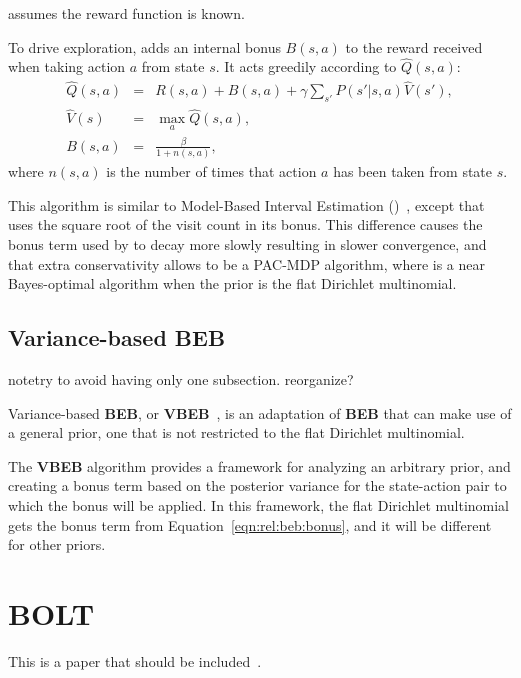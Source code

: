  assumes the reward function is known.

To drive exploration,  adds an internal bonus $B(s,a)$ to the reward received when taking action $a$ from state $s$. It acts greedily according to $\hat Q(s,a)$:
\begin{eqnarray}
\hat Q(s,a)&=&R(s,a)+B(s,a)+\gamma \sum_{s'} P(s'|s,a)\hat V(s'),\\
\hat V(s)&=& \max_a \hat Q(s, a),\\
\label{eqn:rel:beb:bonus}
B(s,a)&=&\frac\beta{1+n(s,a)},
\end{eqnarray}
where $n(s,a)$ is the number of times that action $a$ has been taken from state $s$.

This algorithm is similar to Model-Based Interval Estimation ()~\cite{strehl06}, except that  uses the square root of the visit count in its bonus. This difference causes the bonus term used by  to decay more slowly resulting in slower convergence, and that extra conservativity allows  to be a PAC-MDP algorithm, where  is a near Bayes-optimal algorithm when the prior is the flat Dirichlet multinomial.

\subsection{Variance-based BEB}

note{try to avoid having only one subsection.  reorganize?}

Variance-based {\bf BEB}, or {\bf VBEB}~\cite{sorg10}, is an adaptation of {\bf BEB} that can make use of a general prior, one that is not restricted to the flat Dirichlet multinomial.

The {\bf VBEB} algorithm provides a framework for analyzing an arbitrary prior, and creating a bonus term based on the posterior variance for the state-action pair to which the bonus will be applied. In this framework, the flat Dirichlet multinomial gets the bonus term from Equation~\ref{eqn:rel:beb:bonus}, and it will be different for other priors.



\section{BOLT}

This is a paper that should be included~\cite{araya2012near}. 


